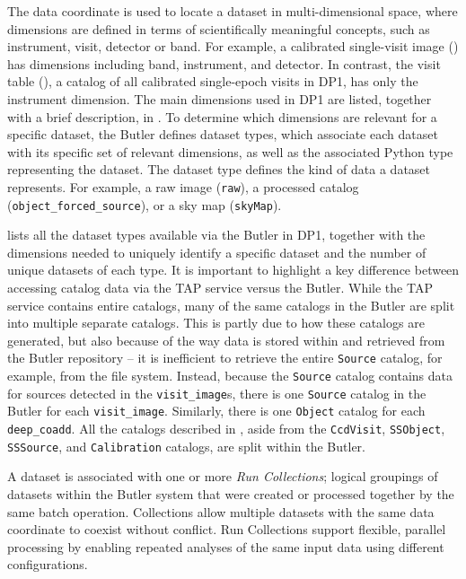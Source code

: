 The data coordinate is used to locate a dataset in multi-dimensional space, where dimensions are defined in terms of scientifically meaningful concepts, such as instrument, visit, detector or band.
For example, a calibrated single-visit image () has dimensions including band, instrument, and detector. 
In contrast, the visit table (), a catalog of all calibrated single-epoch visits in DP1, has only the instrument dimension.
The main dimensions used in DP1 are listed, together with a brief description, in .
To determine which dimensions are relevant for a specific dataset, the Butler defines dataset types, which associate each dataset with its specific set of relevant dimensions, as well as the associated Python type representing the dataset.
The dataset type defines the kind of data a dataset represents. 
For example, a raw image  (\texttt{raw}), a processed catalog (\texttt{object\_forced\_source}), or a sky map (\texttt{skyMap}).

 lists all the dataset types available via the Butler in DP1, together with the dimensions needed to uniquely identify a specific dataset and the number of unique datasets of each type. It is important to highlight a key difference between accessing catalog data via the TAP service versus the Butler. While the TAP service contains entire catalogs, many of the same catalogs in the Butler are split into multiple separate catalogs. This is partly due to how these catalogs are generated, but also because of the way data is stored within and retrieved from the Butler repository -- it is inefficient to retrieve the entire \texttt{Source} catalog, for example, from the file system. Instead, because the \texttt{Source} catalog contains data for sources detected in the \texttt{visit\_image}s, there is one \texttt{Source} catalog in the Butler for each \texttt{visit\_image}. Similarly, there is one \texttt{Object} catalog for each \texttt{deep\_coadd}. All the catalogs described in , aside from the \texttt{CcdVisit}, \texttt{SSObject}, \texttt{SSSource}, and \texttt{Calibration} catalogs, are split within the Butler.



A dataset is associated with one or more \emph{Run Collections}; logical groupings of  datasets within the Butler system that were created or processed together by the same batch operation. 
Collections allow multiple datasets with the same data coordinate to coexist without conflict. 
Run Collections support flexible, parallel processing by enabling repeated analyses of the same input data using different configurations.

